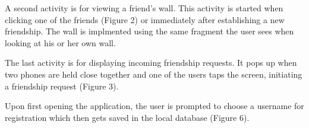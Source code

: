\documentclass{report}
\begin{document}
\begin{figure}[H]
	\centering
	\hfill
	\hfill
	
\end{figure}

A second activity is for viewing a friend's wall. This activity is started when clicking one of the friends (Figure 2) or immediately after establishing a new friendship. The wall is implmented using the same fragment the user sees when looking at his or her own wall.\newline

The last activity is for displaying incoming friendship requests. It pops up when two phones are held close together and one of the users taps the screen, initiating a friendship request (Figure 3).

Upon first opening the application, the user is prompted to choose a username for registration which then gets saved in the local database (Figure 6).
\end{document}
